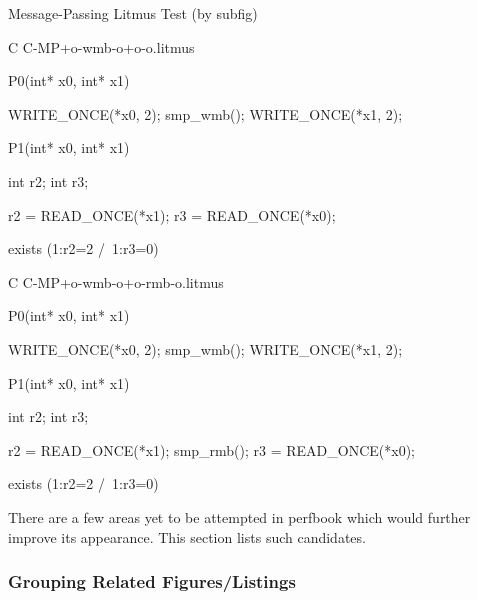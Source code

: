 \begin{listing*}%
\caption{Message-Passing Litmus Test (by subfig)}%
\label{lst:app:styleguide:Message-Passing Litmus Test (subfig)}%
{\scriptsize%
\begin{verbbox}[\LstLineNo]
C C-MP+o-wmb-o+o-o.litmus

{
}

P0(int* x0, int* x1) {

  WRITE_ONCE(*x0, 2);
  smp_wmb();
  WRITE_ONCE(*x1, 2);

}

P1(int* x0, int* x1) {

  int r2;
  int r3;

  r2 = READ_ONCE(*x1);
  r3 = READ_ONCE(*x0);

}


exists (1:r2=2 /\ 1:r3=0)
\end{verbbox}
}
\centering
\hspace*{\fill}
\hspace{\fill}
{\scriptsize%
\begin{verbbox}[\LstLineNo]
C C-MP+o-wmb-o+o-rmb-o.litmus

{
}

P0(int* x0, int* x1) {

  WRITE_ONCE(*x0, 2);
  smp_wmb();
  WRITE_ONCE(*x1, 2);

}

P1(int* x0, int* x1) {

  int r2;
  int r3;

  r2 = READ_ONCE(*x1);
  smp_rmb();
  r3 = READ_ONCE(*x0);

}

exists (1:r2=2 /\ 1:r3=0)
\end{verbbox}
}%
\hspace*{\fill}%
\end{listing*}

There are a few areas yet to be attempted in perfbook
which would further improve its appearance.
This section lists such candidates.

\subsubsection{Grouping Related Figures/Listings}
\label{sec:app:styleguide:Grouping Related Figures/Listings}

